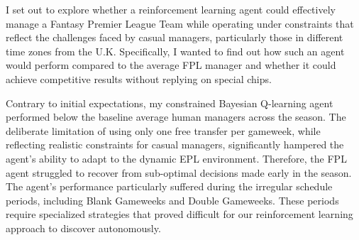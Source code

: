 I set out to explore whether a reinforcement learning agent could effectively manage a Fantasy Premier League Team while operating under constraints that reflect the challenges faced by casual managers, particularly those in different time zones from the U.K. Specifically, I wanted to find out how such an agent would perform compared to the average FPL manager and whether it could achieve competitive results without replying on special chips.

Contrary to initial expectations, my constrained Bayesian Q-learning agent performed below the baseline average human managers across the season. The deliberate limitation of using only one free transfer per gameweek, while reflecting realistic constraints for casual managers, significantly hampered the agent's ability to adapt to the dynamic EPL environment. Therefore, the FPL agent struggled to recover from sub-optimal decisions made early in the season. The agent's performance particularly suffered during the irregular schedule periods, including Blank Gameweeks and Double Gameweeks. These periods require specialized strategies that proved difficult for our reinforcement learning approach to discover autonomously.
